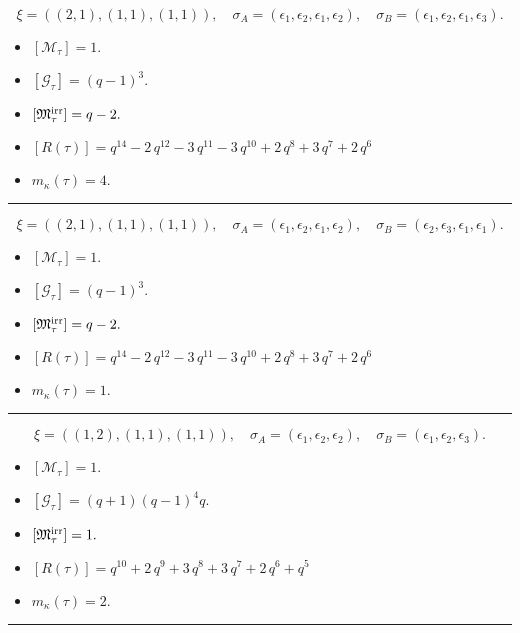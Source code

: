 \documentclass[10pt,a4paper]{amsart}
\begin{document}
$$\xi = ({(2, 1), (1, 1), (1, 1)}),\quad \sigma_A = ({{\epsilon_1, \epsilon_2}, {\epsilon_1}, {\epsilon_2}}),\quad \sigma_B = ({{\epsilon_1, \epsilon_2}, {\epsilon_1}, {\epsilon_3}}).$$

\begin{itemize}
 \item $[\mathcal{M}_{\tau}] = 1 .$

 \item $[\mathcal{G}_{\tau}] = {\left(q - 1\right)}^{3} .$

 \item $[{\frak M}_{\tau}^{\textrm{irr}}] = q - 2 .$

 \item $[R(\tau)] = q^{14} - 2 \, q^{12} - 3 \, q^{11} - 3 \, q^{10} + 2 \, q^{8} + 3 \, q^{7} + 2 \, q^{6} $

 \item $m_{\kappa}(\tau) = 4 .$

 \end{itemize}
\noindent\rule{8cm}{0.4pt}

$$\xi = ({(2, 1), (1, 1), (1, 1)}),\quad \sigma_A = ({{\epsilon_1, \epsilon_2}, {\epsilon_1}, {\epsilon_2}}),\quad \sigma_B = ({{\epsilon_2, \epsilon_3}, {\epsilon_1}, {\epsilon_1}}).$$

\begin{itemize}
 \item $[\mathcal{M}_{\tau}] = 1 .$

 \item $[\mathcal{G}_{\tau}] = {\left(q - 1\right)}^{3} .$

 \item $[{\frak M}_{\tau}^{\textrm{irr}}] = q - 2 .$

 \item $[R(\tau)] = q^{14} - 2 \, q^{12} - 3 \, q^{11} - 3 \, q^{10} + 2 \, q^{8} + 3 \, q^{7} + 2 \, q^{6} $

 \item $m_{\kappa}(\tau) = 1 .$

 \end{itemize}
\noindent\rule{8cm}{0.4pt}

$$\xi = ({(1, 2), (1, 1), (1, 1)}),\quad \sigma_A = ({{\epsilon_1}, {\epsilon_2}, {\epsilon_2}}),\quad \sigma_B = ({{\epsilon_1}, {\epsilon_2}, {\epsilon_3}}).$$

\begin{itemize}
 \item $[\mathcal{M}_{\tau}] = 1 .$

 \item $[\mathcal{G}_{\tau}] = {\left(q + 1\right)} {\left(q - 1\right)}^{4} q .$

 \item $[{\frak M}_{\tau}^{\textrm{irr}}] = 1 .$

 \item $[R(\tau)] = q^{10} + 2 \, q^{9} + 3 \, q^{8} + 3 \, q^{7} + 2 \, q^{6} + q^{5} $

 \item $m_{\kappa}(\tau) = 2 .$

 \end{itemize}
\noindent\rule{8cm}{0.4pt}
\end{document}
